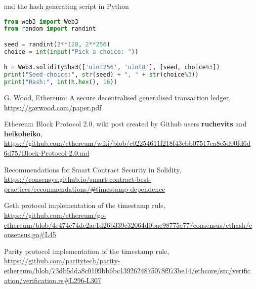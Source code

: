 \documentclass{article}
\begin{document}
    \noindent and the hash generating script in Python
    \begin{lstlisting}[language=Python]
from web3 import Web3
from random import randint

seed = randint(2**128, 2**256)
choice = int(input("Pick a choice: "))

h = Web3.soliditySha3(['uint256', 'uint8'], [seed, choice%3])
print("Seed-choice:", str(seed) + ", " + str(choice%3))
print("Hash:", int(h.hex(), 16))
    \end{lstlisting}

    \begin{thebibliography}{9}
        G. Wood, Ethereum: A secure decentralised
        generalised transaction ledger,
        \url{https://gavwood.com/paper.pdf}

        Ethereum Block Protocol 2.0, wiki post created by
        Github users {\bfseries ruchevits} and {\bfseries
        heikoheiko},
        \url{https://github.com/ethereum/wiki/blob/c02254611f218f43cbb07517ca8e5d00fd6d6d75/Block-Protocol-2.0.md}
        
        Recommendations for Smart Contract Security in
        Solidity,
        \url{https://consensys.github.io/smart-contract-best-practices/recommendations/#timestamp-dependence}
        
        Geth protocol implementation of the timestamp rule,
        \url{https://github.com/ethereum/go-ethereum/blob/4e474c74dc2ac1d26b339c32064d0bac98775e77/consensus/ethash/consensus.go#L45}

        Parity protocol implementation of the timestamp
        rule,
        \url{https://github.com/paritytech/parity-ethereum/blob/73db5dda8c0109bb6bc1392624875078f973be14/ethcore/src/verification/verification.rs#L296-L307}
    \end{thebibliography}
\end{document}
